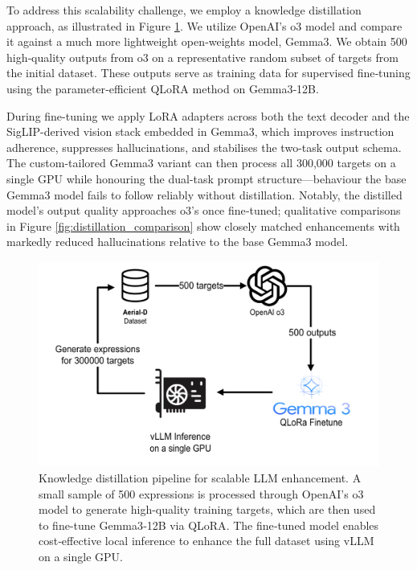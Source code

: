 To address this scalability challenge, we employ a knowledge distillation approach, as illustrated in Figure \ref{fig:llm_distillation}. We utilize OpenAI's o3 model\cite{o3} and compare it against a much more lightweight open‑weights model, Gemma3\cite{gemma3}. We obtain 500 high‑quality outputs from o3 on a representative random subset of targets from the initial dataset. These outputs serve as training data for supervised fine‑tuning using the parameter‑efficient QLoRA method\cite{qlora} on Gemma3‑12B.

During fine-tuning we apply LoRA adapters across both the text decoder and the SigLIP-derived vision stack embedded in Gemma3, which improves instruction adherence, suppresses hallucinations, and stabilises the two-task output schema. The custom-tailored Gemma3 variant can then process all 300,000 targets on a single GPU while honouring the dual-task prompt structure—behaviour the base Gemma3 model fails to follow reliably without distillation. Notably, the distilled model's output quality approaches o3's once fine‑tuned; qualitative comparisons in Figure \ref{fig:distillation_comparison} show closely matched enhancements with markedly reduced hallucinations relative to the base Gemma3 model.

\begin{figure}[t]
\centering
\includegraphics[width=\columnwidth]{Images/distillation.png}
\caption{Knowledge distillation pipeline for scalable LLM enhancement. A small sample of 500 expressions is processed through OpenAI's o3 model\cite{o3} to generate high-quality training targets, which are then used to fine-tune Gemma3‑12B\cite{gemma3} via QLoRA\cite{qlora}. The fine‑tuned model enables cost‑effective local inference to enhance the full dataset using vLLM\cite{vllm} on a single GPU.}
\label{fig:llm_distillation}
\end{figure}

